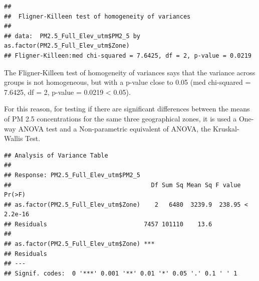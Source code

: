 \documentclass[12pt,]{article}
\newenvironment{Shaded}{\begin{snugshade}}{\end{snugshade}}
\newcommand{\KeywordTok}[1]{\textcolor[rgb]{0.13,0.29,0.53}{\textbf{#1}}}
\newcommand{\DecValTok}[1]{\textcolor[rgb]{0.00,0.00,0.81}{#1}}
\newcommand{\FloatTok}[1]{\textcolor[rgb]{0.00,0.00,0.81}{#1}}
\newcommand{\StringTok}[1]{\textcolor[rgb]{0.31,0.60,0.02}{#1}}
\newcommand{\OperatorTok}[1]{\textcolor[rgb]{0.81,0.36,0.00}{\textbf{#1}}}
\newcommand{\NormalTok}[1]{#1}
\begin{document}
\begin{verbatim}
## 
##  Fligner-Killeen test of homogeneity of variances
## 
## data:  PM2.5_Full_Elev_utm$PM2_5 by as.factor(PM2.5_Full_Elev_utm$Zone)
## Fligner-Killeen:med chi-squared = 7.6425, df = 2, p-value = 0.0219
\end{verbatim}

The Fligner-Killeen test of homogeneity of variances says that the
variance across groups is not homogeneous, but with a p-value close to
0.05 (med chi-squared = 7.6425, df = 2, p-value = 0.0219 \textless{}
0.05).

For this reason, for testing if there are significant differences
between the means of PM 2.5 concentrations for the same three
geographical zones, it is used a One-way ANOVA test and a Non-parametric
equivalent of ANOVA, the Kruskal-Wallis Test.

\begin{Shaded}
\end{Shaded}

\begin{verbatim}
## Analysis of Variance Table
## 
## Response: PM2.5_Full_Elev_utm$PM2_5
##                                       Df Sum Sq Mean Sq F value    Pr(>F)
## as.factor(PM2.5_Full_Elev_utm$Zone)    2   6480  3239.9  238.95 < 2.2e-16
## Residuals                           7457 101110    13.6                  
##                                        
## as.factor(PM2.5_Full_Elev_utm$Zone) ***
## Residuals                              
## ---
## Signif. codes:  0 '***' 0.001 '**' 0.01 '*' 0.05 '.' 0.1 ' ' 1
\end{verbatim}

\begin{Shaded}
\end{Shaded}
\end{document}
